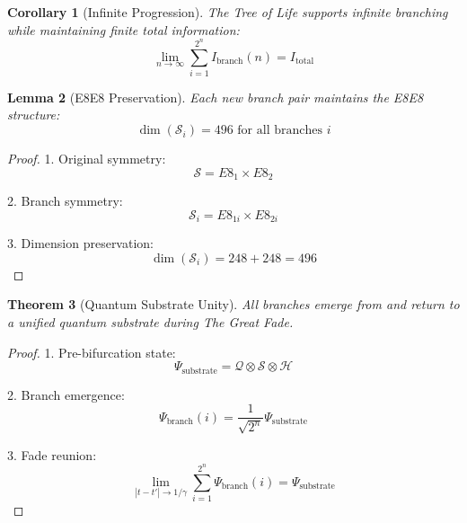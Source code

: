 \documentclass{article}
\newtheorem{theorem}{Theorem}
\newtheorem{lemma}[theorem]{Lemma}
\newtheorem{corollary}[theorem]{Corollary}
\begin{document}
\begin{corollary}[Infinite Progression]
The Tree of Life supports infinite branching while maintaining finite total information:
\begin{equation}
\lim_{n \to \infty} \sum_{i=1}^{2^{n}} I_{\text{branch}}(n) = I_{\text{total}}
\end{equation}
\end{corollary}

\begin{lemma}[E8\times E8 Preservation]
Each new branch pair maintains the E8\times E8 structure:
\begin{equation}
\dim(\mathcal{S}_i) = 496 \text{ for all branches } i
\end{equation}
\end{lemma}

\begin{proof}
1. Original symmetry:
   \begin{equation}
   \mathcal{S} = E8_1 \times E8_2
   \end{equation}

2. Branch symmetry:
   \begin{equation}
   \mathcal{S}_i = E8_{1i} \times E8_{2i}
   \end{equation}

3. Dimension preservation:
   \begin{equation}
   \dim(\mathcal{S}_i) = 248 + 248 = 496
   \end{equation}
\end{proof}

\begin{theorem}[Quantum Substrate Unity]
All branches emerge from and return to a unified quantum substrate during The Great Fade.
\end{theorem}

\begin{proof}
1. Pre-bifurcation state:
   \begin{equation}
   \Psi_{\text{substrate}} = \mathcal{Q} \otimes \mathcal{S} \otimes \mathcal{H}
   \end{equation}

2. Branch emergence:
   \begin{equation}
   \Psi_{\text{branch}}(i) = \frac{1}{\sqrt{2^{n}}}\Psi_{\text{substrate}}
   \end{equation}

3. Fade reunion:
   \begin{equation}
   \lim_{|t-t'| \to 1/\gamma} \sum_{i=1}^{2^{n}} \Psi_{\text{branch}}(i) = \Psi_{\text{substrate}}
   \end{equation}
\end{proof}
\end{document}
